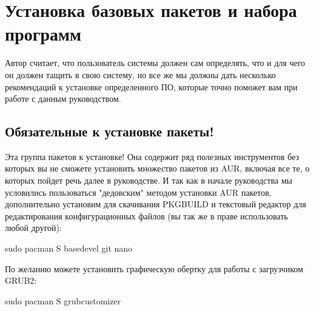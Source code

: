 \documentclass[letterpaper,10pt,russian,openany]{sphinxmanual}
\begin{document}
\ignorespaces 

\section{Установка базовых пакетов и набора программ}
\label{\detokenize{source/first-steps:basic-software-installation}}\label{\detokenize{source/first-steps:index-4}}\label{\detokenize{source/first-steps:id4}}
\sphinxAtStartPar
Автор считает, что пользователь системы должен сам определять, что и для чего он должен тащить в свою систему,
но все же мы должны дать несколько рекомендаций к установке определенного ПО, которые точно поможет вам при работе с данным руководством.

\ignorespaces 

\subsection{Обязательные к установке пакеты!}
\label{\detokenize{source/first-steps:mandatory-packages}}\label{\detokenize{source/first-steps:index-5}}\label{\detokenize{source/first-steps:id5}}
\sphinxAtStartPar
Эта группа пакетов  к установке! Она содержит ряд полезных
инструментов без которых вы не сможете установить множество пакетов из AUR, включая
все те, о которых пойдет речь далее в руководстве. И так как в начале руководства
мы условились пользоваться "дедовским" методом установки AUR пакетов, дополнительно
установим  для скачивания PKGBUILD и текстовый редактор  для редактирования
конфигурационных файлов (вы так же в праве использовать любой другой):

\begin{sphinxVerbatim}[commandchars=\\\{\}]
sudo pacman \PYGZhy{}S base\PYGZhy{}devel git nano
\end{sphinxVerbatim}

\sphinxAtStartPar
По желанию можете установить графическую обертку для работы с загрузчиком GRUB2:

\begin{sphinxVerbatim}[commandchars=\\\{\}]
sudo pacman \PYGZhy{}S grub\PYGZhy{}customizer
\end{sphinxVerbatim}
\end{document}
